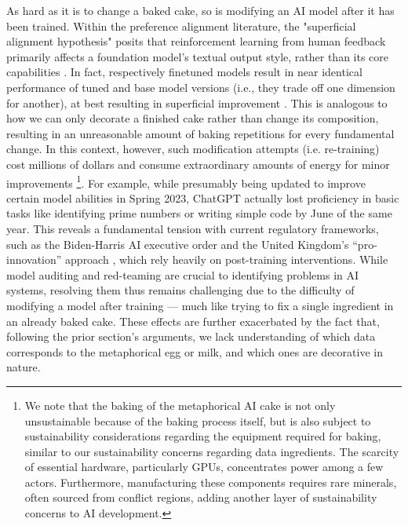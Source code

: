 \documentclass[manuscript,screen,authorversion,nonacm]{acmart}
\begin{document}
As hard as it is to change a baked cake, so is modifying an AI model after it has been trained.
Within the preference alignment literature, the "superficial alignment hypothesis" posits that reinforcement learning from human feedback primarily affects a foundation model's \cite{Radford2019GPT2,Touvron2023llama2} textual output style, rather than its core capabilities \cite{Zhou2023SuperficialAlignment}.
In fact, respectively finetuned models result in near identical performance of tuned and base model versions (i.e., they trade off one dimension for another), at best resulting in superficial improvement \cite{Lin2024RethinkingLLMAlignment}. 
This is analogous to how we can only decorate a finished cake rather than change its composition, resulting in an unreasonable amount of baking repetitions for every fundamental change. In this context, however, such modification attempts (i.e. re-training) cost millions of dollars \cite{Koetsier2023ChatGPTburnsmillions,Vanian2023ChatGPTCosts} and consume extraordinary amounts of energy for minor improvements \cite{Strubell2019energy,So2019EvolvedTransformer}\footnote{We note that the baking of the metaphorical AI cake is not only unsustainable because of the baking process itself, but is also subject to sustainability considerations regarding the equipment required for baking, similar to our sustainability concerns regarding data ingredients. The scarcity of essential hardware, particularly GPUs, concentrates power among a few actors. Furthermore, manufacturing these components requires rare minerals, 
often sourced from conflict regions, adding another layer of sustainability concerns to AI development.}.
For example, while presumably being updated to improve certain model abilities in Spring 2023, ChatGPT actually lost proficiency in basic tasks like identifying prime numbers or writing simple code \cite{chen2023chatgptforgets} by June of the same year. This reveals a fundamental tension with current regulatory frameworks, such as the Biden-Harris AI executive order \cite{BidenHarrisAI,BidenHarrisAIIEEE} and the United Kingdom's ``pro-innovation'' approach \cite{UKProInnovationAI}, which rely heavily on post-training interventions.
While model auditing and red-teaming are crucial to identifying problems in AI systems, resolving them thus remains challenging due to the difficulty of modifying a model after training --- much like trying to fix a single ingredient in an already baked cake. These effects are further exacerbated by the fact that, following the prior section's arguments, we lack understanding of which data corresponds to the metaphorical egg or milk, and which ones are decorative in nature.
\end{document}
